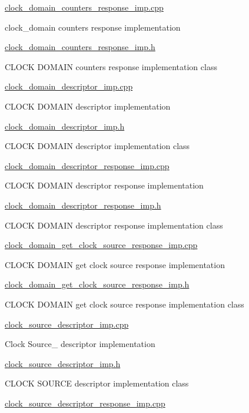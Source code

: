 \hyperlink{clock__domain__counters__response__imp_8cpp}{clock\+\_\+domain\+\_\+counters\+\_\+response\+\_\+imp.\+cpp}

clock\+\_\+domain counters response implementation

\hyperlink{clock__domain__counters__response__imp_8h}{clock\+\_\+domain\+\_\+counters\+\_\+response\+\_\+imp.\+h}

C\+L\+O\+CK D\+O\+M\+A\+IN counters response implementation class

\hyperlink{clock__domain__descriptor__imp_8cpp}{clock\+\_\+domain\+\_\+descriptor\+\_\+imp.\+cpp}

C\+L\+O\+CK D\+O\+M\+A\+IN descriptor implementation

\hyperlink{clock__domain__descriptor__imp_8h}{clock\+\_\+domain\+\_\+descriptor\+\_\+imp.\+h}

C\+L\+O\+CK D\+O\+M\+A\+IN descriptor implementation class

\hyperlink{clock__domain__descriptor__response__imp_8cpp}{clock\+\_\+domain\+\_\+descriptor\+\_\+response\+\_\+imp.\+cpp}

C\+L\+O\+CK D\+O\+M\+A\+IN descriptor response implementation

\hyperlink{clock__domain__descriptor__response__imp_8h}{clock\+\_\+domain\+\_\+descriptor\+\_\+response\+\_\+imp.\+h}

C\+L\+O\+CK D\+O\+M\+A\+IN descriptor response implementation class

\hyperlink{clock__domain__get__clock__source__response__imp_8cpp}{clock\+\_\+domain\+\_\+get\+\_\+clock\+\_\+source\+\_\+response\+\_\+imp.\+cpp}

C\+L\+O\+CK D\+O\+M\+A\+IN get clock source response implementation

\hyperlink{clock__domain__get__clock__source__response__imp_8h}{clock\+\_\+domain\+\_\+get\+\_\+clock\+\_\+source\+\_\+response\+\_\+imp.\+h}

C\+L\+O\+CK D\+O\+M\+A\+IN get clock source response implementation class

\hyperlink{clock__source__descriptor__imp_8cpp}{clock\+\_\+source\+\_\+descriptor\+\_\+imp.\+cpp}

Clock Source\+\_\+ descriptor implementation

\hyperlink{clock__source__descriptor__imp_8h}{clock\+\_\+source\+\_\+descriptor\+\_\+imp.\+h}

C\+L\+O\+CK S\+O\+U\+R\+CE descriptor implementation class

\hyperlink{clock__source__descriptor__response__imp_8cpp}{clock\+\_\+source\+\_\+descriptor\+\_\+response\+\_\+imp.\+cpp}


